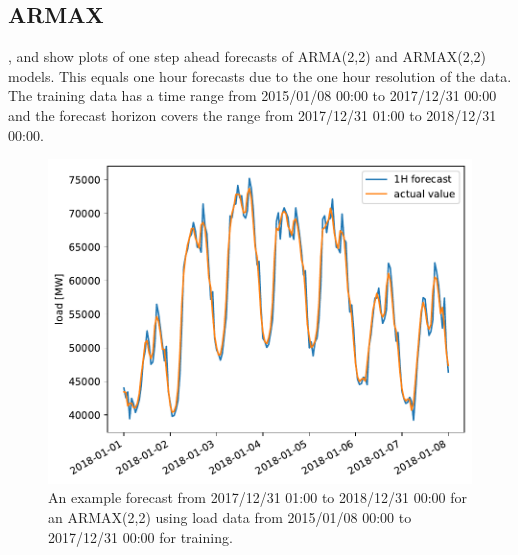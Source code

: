 \subsection*{ARMAX}

,  and  show plots of one step ahead forecasts of ARMA(2,2) and ARMAX(2,2) models. This equals one hour forecasts due to the one hour resolution of the data. The training data has a time range from 2015/01/08 00:00 to 2017/12/31 00:00 and the forecast horizon covers the range from 2017/12/31 01:00 to 2018/12/31 00:00.\\

\begin{figure}[h!]%
\centering
\includegraphics[width=\textwidth]{plots/ARMAXfc/ARMAX_p2q2_data2015to2017_fcto2018123100_plot_range2018010100_2018010800}%
\caption{An example forecast from 2017/12/31 01:00 to 2018/12/31 00:00 for an ARMAX(2,2) using load data from 2015/01/08 00:00 to 2017/12/31 00:00 for training.}%
\label{fig:armax_fc}%
\end{figure}

